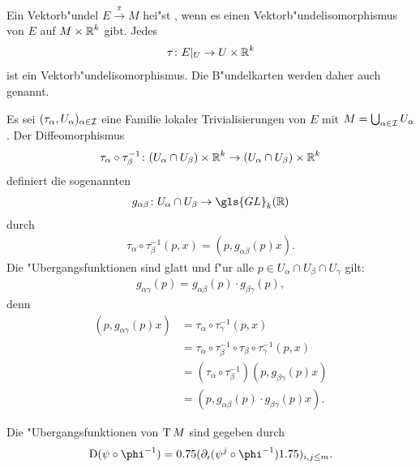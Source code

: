 Ein Vektorb"undel $E \xrightarrow{\pi} M$ hei"st , wenn es einen Vektorb"undelisomorphismus von $E$ auf $M \times \operatorname{\mathbb{R}}^k$ gibt. Jedes
\begin{align*}
  \tau \colon E|_U \to U \times \operatorname{\mathbb{R}}^k
\end{align*}
ist ein Vektorb"undelisomorphismus.
Die B"undelkarten werden daher auch  genannt.

Es sei $(\tau_\alpha,U_{\alpha})_{\alpha \in \operatorname{\mathcal{I}}}$ eine Familie lokaler Trivialisierungen von $E$ mit $M = \bigcup_{\alpha \in \operatorname{\mathcal{I}}}U_{\alpha}$.
Der Diffeomorphismus
\begin{align*}
  \tau_{\alpha} \circ \tau_{\beta}^{-1}\colon (U_{\alpha} \cap U_{\beta}) \times \operatorname{\mathbb{R}}^k \to (U_{\alpha} \cap U_{\beta}) \times \operatorname{\mathbb{R}}^k
\end{align*}
definiert die sogenannten 
\begin{align*}
  g_{\alpha\beta} \colon U_{\alpha} \cap U_{\beta} \to \gls{GL}_k(\R)
\end{align*}
durch 
\begin{align*}
  \tau_{\alpha} \circ \tau_{\beta}^{-1}(p,x) = (p,g_{\alpha\beta}(p) x).
\end{align*}
Die "Ubergangsfunktionen sind glatt und f"ur alle $p \in U_{\alpha} \cap U_{\beta} \cap U_{\gamma}$ gilt:
\begin{align*}
  g_{\alpha\gamma}(p) = g_{\alpha\beta}(p) \cdot g_{\beta\gamma}(p),
\end{align*}
denn
\begin{align*}
	(p,g_{\alpha\gamma}(p)x) & = \tau_{\alpha} \circ \tau_{\gamma}^{-1}(p,x)\\
	& = \tau_{\alpha} \circ \tau_{\beta}^{-1} \circ \tau_{\beta} \circ \tau_{\gamma}^{-1}(p,x)\\
	& = (\tau_{\alpha} \circ \tau_{\beta}^{-1})(p,g_{\beta\gamma}(p)x)\\
	& = (p,g_{\alpha\beta}(p)\cdot g_{\beta\gamma}(p)x).
\end{align*}

\begin{bsp}
  Die "Ubergangsfunktionen von $\operatorname{T} M$ sind gegeben durch
  \begin{align*}
    \D(\psi \circ \phi^{-1}) = \left(\partial_i(\psi^j \circ \phi^{-1})\right)_{i,j \leq m}.
  \end{align*}
\end{bsp}

